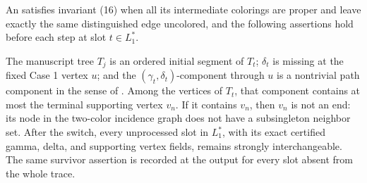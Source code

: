\begin{definition}
An  satisfies invariant (16) when
all its intermediate colorings are proper and leave exactly the same
distinguished edge uncolored, and the following assertions hold before
each step at slot \(t\in L_1^*\).

The manuscript tree \(T_j\) is an ordered initial segment of \(T_t\);
\(\delta_t\) is missing at the fixed Case 1 vertex \(u\); and the
\((\gamma_t,\delta_t)\)-component through \(u\) is a nontrivial path
component in the sense of
.
Among the vertices of \(T_t\), that component contains at most the
terminal supporting vertex \(v_n\).  If it contains \(v_n\), then
\(v_n\) is not an end: its node in the two-color incidence graph does not
have a subsingleton neighbor set.  After the switch, every unprocessed
slot in \(L_1^*\), with its exact certified gamma, delta, and supporting
vertex fields, remains strongly interchangeable.  The same survivor
assertion is recorded at the output for every slot absent from the whole
trace.
\end{definition}
